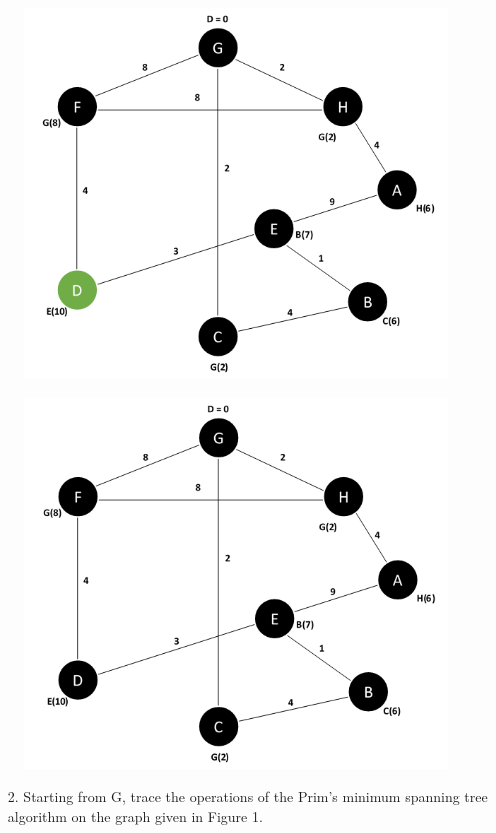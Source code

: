 \documentclass{article}
\begin{document}
\begin{figure}[H]
\centering
\includegraphics[scale=0.6]{images/Q1/08.png}
\end{figure}

\begin{figure}[H]
\centering
\includegraphics[scale=0.6]{images/Q1/09.png}
\end{figure}

\begin{enumerate}[leftmargin=\labelsep]
  \item[2.] Starting from G, trace the operations of the Prim's minimum spanning tree algorithm on the graph given in Figure 1.
\end{enumerate}
\end{document}
